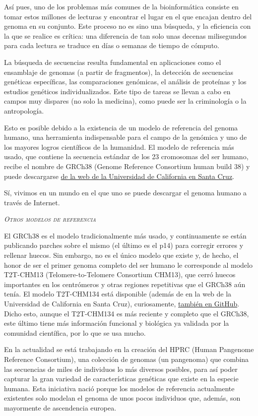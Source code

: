 \documentclass[10pt,a4paper,spanish]{article}
\newcommand{\sombreado}[2]{
  \begin{shaded}
    \begin{center} \emph{\textsc{#1}} \end{center}
    \noindent #2\\
  \end{shaded}
}
\begin{document}
Así pues, uno de los problemas más comunes de la bioinformática consiste en tomar estos millones de lecturas y encontrar el lugar en el que encajan dentro del genoma en su conjunto. Este proceso no es sino una búsqueda, y la eficiencia con la que se realice es crítica: una diferencia de tan solo unas decenas milisegundos para cada lectura se traduce en días o semanas de tiempo de cómputo.

La búsqueda de secuencias resulta fundamental en aplicaciones como el ensamblaje de genomas (a partir de fragmentos), la detección de secuencias genéticas específicas, las comparaciones genómicas, el análisis de proteínas y los estudios genéticos individualizados. Este tipo de tareas se llevan a cabo en campos muy dispares (no solo la medicina), como puede ser la criminología o la antropología.

Esto es posible debido a la existencia de un modelo de referencia del genoma humano, una herramienta indispensable para el campo de la genómica y uno de los mayores logros científicos de la humanidad. El modelo de referencia más usado, que contiene la secuencia estándar de los 23 cromosomas del ser humano, recibe el nombre de GRCh38 (Genome Reference Consortium human build 38) y puede descargarse \href{https://hgdownload.cse.ucsc.edu/downloads.html#human}{de la web de la Universidad de California en Santa Cruz}.

Sí, vivimos en un mundo en el que uno se puede descargar el genoma humano a través de Internet.

\sombreado{Otros modelos de referencia}{El GRCh38 es el modelo tradicionalmente más usado, y continuamente se están publicando parches sobre el mismo (el último es el p14) para corregir errores y rellenar huecos. Sin embargo, no es el único modelo que existe y, de hecho, el honor de ser el primer genoma completo del ser humano le corresponde al modelo T2T-CHM13 (Telomere-to-Telomere Consortium CHM13), que cerró huecos importantes en los centrómeros y otras regiones repetitivas que el GRCh38 aún tenía. El modelo T2T-CHM134 está disponible (además de en la web de la Universidad de California en Santa Cruz), curiosamente, \href{https://github.com/marbl/CHM13}{también en GitHub}. Dicho esto, aunque el T2T-CHM134 es más reciente y completo que el GRCh38, este último tiene más información funcional y biológica ya validada por la comunidad científica, por lo que se usa mucho.

En la actualidad se está trabajando en la creación del HPRC (Human Pangenome Reference Consortium), una colección de genomas (un pangenoma) que combina las secuencias de miles de individuos lo más diversos posibles, para así poder capturar la gran variedad de características genéticas que existe en la especie humana. Esta iniciativa nació porque los modelos de referencia actualmente existentes solo modelan el genoma de unos pocos individuos que, además, son mayormente de ascendencia europea.}
\end{document}
